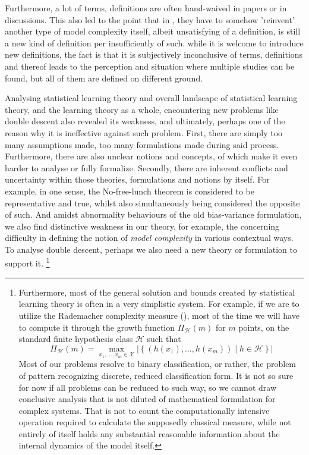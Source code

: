 \documentclass[10pt]{article} %
\begin{document}
Furthermore, a lot of terms, definitions are often hand-waived in papers or in discussions. This also led to the point that in \cite{nakkiran_deep_2019}, they have to somehow 'reinvent' another type of model complexity itself, albeit unsatisfying of a definition, is still a new kind of definition per insufficiently of such. while it is welcome to introduce new definitions, the fact is that it is subjectively inconclusive of terms, definitions and thereof leads to the perception and situation where multiple studies can be found, but all of them are defined on different ground.

Analysing statistical learning theory and overall landscape of statistical learning theory, and the learning theory as a whole, encountering new problems like double descent also revealed its weakness, and ultimately, perhaps one of the reason why it is ineffective against such problem. First, there are simply too many assumptions made, too many formulations made during said process. Furthermore, there are also unclear notions and concepts, of which make it even harder to analyse or fully formalize. Secondly, there are inherent conflicts and uncertainty within those theories, formulations and notions by itself. For example, in one sense, the No-free-lunch theorem is considered to be representative and true, whilst also simultaneously being considered the opposite of such. And amidst abnormality behaviours of the old bias-variance formulation, we also find distinctive weakness in our theory, for example, the concerning difficulty in defining the notion of \textit{model complexity} in various contextual ways. To analyse double descent, perhaps we also need a new theory or formulation to support it. \footnote{Furthermore, most of the general solution and bounds created by statistical learning theory is often in a very simplistic system. For example, if we are to utilize the Rademacher complexity measure (\cite{10.5555/2371238}), most of the time we will have to compute it through the growth function $\Pi_{\mathcal{H}}(m)$ for $m$ points, on the standard finite hypothesis class $\mathcal{H}$ such that 
\begin{equation}
    \Pi_{\mathcal{H}}(m) = \max_{x_1, \dots, x_m \in \mathcal{X}} \left| \left\{ (h(x_1), \dots, h(x_m)) \mid h \in \mathcal{H} \right\} \right|
\end{equation}
Most of our problems resolve to binary classification, or rather, the problem of pattern recognizing discrete, reduced classification form. It is not so sure for now if all problems can be reduced to such way, so we cannot draw conclusive analysis that is not diluted of mathematical formulation for complex systems. That is not to count the computationally intensive operation required to calculate the supposedly classical measure, while not entirely of itself holds any substantial reasonable information about the internal dynamics of the model itself. }
\end{document}
